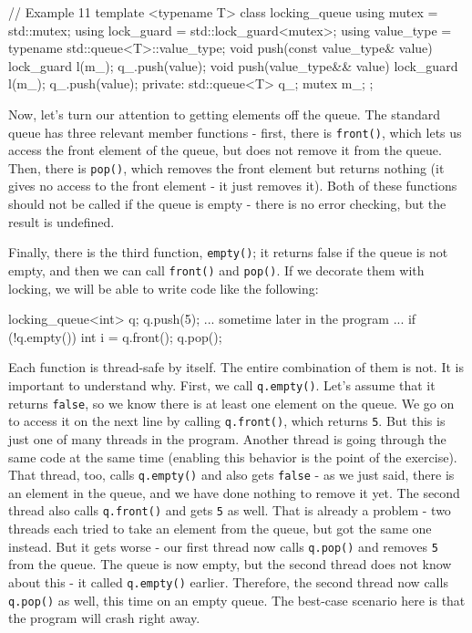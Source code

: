 \begin{code}
// Example 11
template <typename T> class locking_queue {
  using mutex = std::mutex;
  using lock_guard = std::lock_guard<mutex>;
  using value_type = typename std::queue<T>::value_type;
  void push(const value_type& value) {
    lock_guard l(m_);
    q_.push(value);
  }
  void push(value_type&& value) {
    lock_guard l(m_);
    q_.push(value);
  }
  private:
  std::queue<T> q_;
  mutex m_;
};
\end{code}

Now, let's turn our attention to getting elements off the queue. The standard queue has three relevant member functions - first, there is \texttt{front()}, which lets us access the front element of the queue, but does not remove it from the queue. Then, there is \texttt{pop()}, which removes the front element but returns nothing (it gives no access to the front element - it just removes it). Both of these functions should not be called if the queue is empty - there is no error checking, but the result is undefined.

Finally, there is the third function, \texttt{empty()}; it returns false if the queue is not empty, and then we can call \texttt{front()} and \texttt{pop()}. If we decorate them with locking, we will be able to write code like the following:

\begin{code}
locking_queue<int> q;
q.push(5);
... sometime later in the program ...
if (!q.empty()) {
  int i = q.front();
  q.pop();
}
\end{code}

Each function is thread-safe by itself. The entire combination of them is not. It is important to understand why. First, we call \texttt{q.empty()}. Let's assume that it returns \texttt{false}, so we know there is at least one element on the queue. We go on to access it on the next line by calling \texttt{q.front()}, which returns \texttt{5}. But this is just one of many threads in the program. Another thread is going through the same code at the same time (enabling this behavior is the point of the exercise). That thread, too, calls \texttt{q.empty()} and also gets \texttt{false} - as we just said, there is an element in the queue, and we have done nothing to remove it yet. The second thread also calls \texttt{q.front()} and gets \texttt{5} as well. That is already a problem - two threads each tried to take an element from the queue, but got the same one instead. But it gets worse - our first thread now calls \texttt{q.pop()} and removes \texttt{5} from the queue. The queue is now empty, but the second thread does not know about this - it called \texttt{q.empty()} earlier. Therefore, the second thread now calls \texttt{q.pop()} as well, this time on an empty queue. The best-case scenario here is that the program will crash right away.

